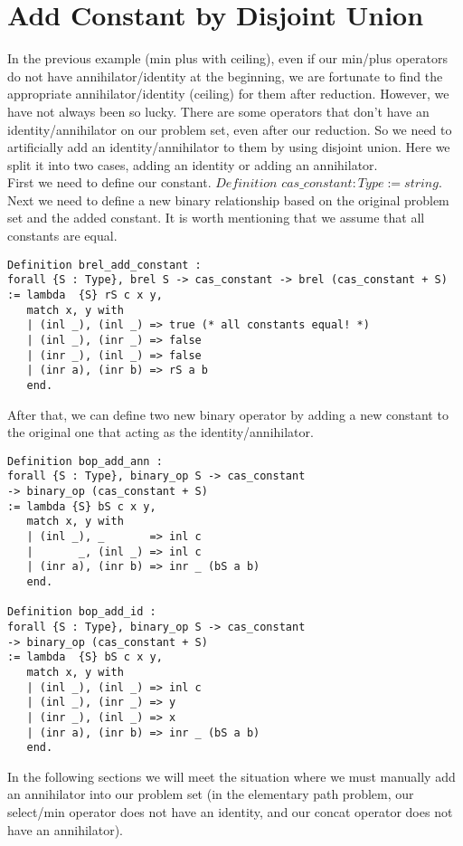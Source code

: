 \documentclass[a4paper,12pt,twoside,openright]{report}
\begin{document}
\section{Add Constant by Disjoint Union}
In the previous example (min plus with ceiling), even if our min/plus operators do not have annihilator/identity at the beginning, we are fortunate to find the appropriate annihilator/identity (ceiling) for them after reduction.
However, we have not always been so lucky. 
There are some operators that don't have an identity/annihilator on our problem set, even after our reduction. So we need to artificially add an identity/annihilator to them by using disjoint union. Here we split it into two cases, adding an identity or adding an annihilator.\\
First we need to define our constant. 
$Definition$ $cas\_constant : Type          := string.   $\\
Next we need to define a new binary relationship based on the original problem set and the added constant. It is worth mentioning that we assume that all constants are equal.
\begin{lstlisting}
Definition brel_add_constant : 
forall {S : Type}, brel S -> cas_constant -> brel (cas_constant + S)
:= lambda  {S} rS c x y, 
   match x, y with
   | (inl _), (inl _) => true (* all constants equal! *) 
   | (inl _), (inr _) => false 
   | (inr _), (inl _) => false 
   | (inr a), (inr b) => rS a b 
   end.
\end{lstlisting}
After that, we can define two new binary operator by adding a new constant to the original one that acting as the identity/annihilator.
\begin{lstlisting}
Definition bop_add_ann : 
forall {S : Type}, binary_op S -> cas_constant 
-> binary_op (cas_constant + S)
:= lambda {S} bS c x y, 
   match x, y with
   | (inl _), _       => inl c
   |       _, (inl _) => inl c
   | (inr a), (inr b) => inr _ (bS a b)
   end.

Definition bop_add_id : 
forall {S : Type}, binary_op S -> cas_constant 
-> binary_op (cas_constant + S)
:= lambda  {S} bS c x y, 
   match x, y with
   | (inl _), (inl _) => inl c 
   | (inl _), (inr _) => y
   | (inr _), (inl _) => x
   | (inr a), (inr b) => inr _ (bS a b)
   end.
\end{lstlisting}
In the following sections we will meet the situation where we must manually add an annihilator into our problem set (in the elementary path problem, our select/min operator does not have an identity, and our concat operator does not have an annihilator).
\end{document}

